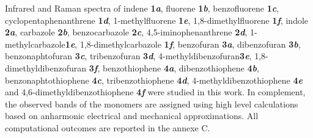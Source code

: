 Infrared and Raman spectra of  indene \textbf{1\textit{a}}, fluorene \textbf{1\textit{b}}, benzofluorene \textbf{1\textit{c}}, cyclopentaphenanthrene \textbf{1\textit{d}}, 1-methylfluorene \textbf{1\textit{e}}, 1,8-dimethylfluorene \textbf{1\textit{f}},
indole \textbf{2\textit{a}}, carbazole \textbf{2\textit{b}}, benzocarbazole \textbf{2\textit{c}}, 4,5-iminophenanthrene \textbf{2\textit{d}}, 1-methylcarbazole\textbf{1\textit{e}}, 1,8-dimethylcarbazole \textbf{1\textit{f}},
benzofuran \textbf{3\textit{a}}, dibenzofuran \textbf{3\textit{b}}, benzonaphtofuran \textbf{3\textit{c}}, tribenzofuran \textbf{3\textit{d}}, 4-methyldibenzofuran\textbf{3\textit{e}}, 1,8-dimethyldibenzofuran \textbf{3\textit{f}},
benzothiophene \textbf{4\textit{a}}, dibenzothiophene \textbf{4\textit{b}}, benzonaphtothiophene \textbf{4\textit{c}}, tribenzothiophene \textbf{4\textit{d}}, 4-methyldibenzothiophene \textbf{4\textit{e}} and 4,6-dimethyldibenzothiophene \textbf{4\textit{f}} were studied in this work. In complement, the observed bands of the monomers are assigned using high level calculations based on anharmonic electrical and mechanical approximations. All computational outcomes are reported in the annexe C.
	
